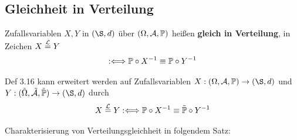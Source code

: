 \subsection*{Gleichheit in Verteilung} %
\begin{definition}\label{def3.16} %
Zufallsvariablen $X,Y$ in $(\S,d)$ über $(\Omega,\A,\P)$ heißen \textbf{gleich in Verteilung}, in Zeichen $X\stackeq{\mathcal{L}} Y$
\begin{align*}
:\Longleftrightarrow \P\circ X^{-1}\equiv\P\circ Y^{-1}
\end{align*}
\end{definition}

\begin{bemerkung} %
Def 3.16 kann erweitert werden auf Zufallsvariablen $X:(\Omega,\A,\P)\to(\S,d)$ und $Y:(\tilde{\Omega},\tilde{\A},\tilde{\P})\to(\S,d)$ durch
\begin{align*}
X\stackeq{\mathcal{L}} Y:\Longleftrightarrow\P\circ X^{-1}\equiv\tilde{\P}\circ Y^{-1}
\end{align*}
\end{bemerkung}

Charakterisierung von Verteilungsgleichheit in folgendem Satz:

